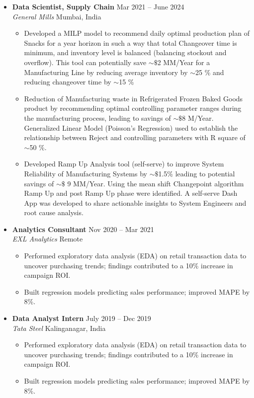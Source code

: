 \documentclass[a4paper,10pt]{article}
\newcommand{\resumeItem}[1]{\item\small{#1}}
\newcommand{\resumeSubheading}[4]{
  \vspace{1pt}\item
    \textbf{#1} \hfill {#2} \\
    \emph{#3} \hfill {#4} \\
}
\begin{document}
\begin{itemize}
    \resumeSubheading
      {Data Scientist, Supply Chain}{Mar 2021 -- June 2024}
      {General Mills}{Mumbai, India}
      \begin{itemize}
          \resumeItem{
            Developed a MILP model to recommend daily optimal production plan of Snacks for a year horizon in such a
            way that total Changeover time is minimum, and inventory level is balanced (balancing stockout and overflow).
            This tool can potentially save $\sim\$$2 MM/Year for a Manufacturing Line by reducing average inventory by $\sim$25 \%
            and reducing changeover time by $\sim$15 \%
          }
          \resumeItem{
            Reduction of Manufacturing waste in Refrigerated Frozen Baked Goods product by recommending optimal
            controlling parameter ranges during the manufacturing process, leading to savings of $\sim\$$8 M/Year. Generalized
            Linear Model (Poisson’s Regression) used to establish the relationship between Reject and controlling
            parameters with R square of $\sim$50 \%.
          }
          \resumeItem{
            Developed Ramp Up Analysis tool (self-serve) to improve System Reliability of Manufacturing Systems by
            $\sim\$$1.5\% leading to potential savings of $\sim\$$ 9 MM/Year. Using the mean shift Changepoint algorithm Ramp Up
            and post Ramp Up phase were identified. A self-serve Dash App was developed to share actionable insights
            to System Engineers and root cause analysis.
          }
      \end{itemize}
    
    \resumeSubheading
      {Analytics Consultant}{Nov 2020 -- Mar 2021}
      {EXL Analytics}{Remote}
      \begin{itemize}
          \resumeItem{Performed exploratory data analysis (EDA) on retail transaction data to uncover purchasing trends; findings contributed to a 10\% increase in campaign ROI.}
          \resumeItem{Built regression models predicting sales performance; improved MAPE by 8\%.}
      \end{itemize}

    \resumeSubheading
      {Data Analyst Intern}{July 2019 -- Dec 2019}
      {Tata Steel}{Kalinganagar, India}
      \begin{itemize}
          \resumeItem{Performed exploratory data analysis (EDA) on retail transaction data to uncover purchasing trends; findings contributed to a 10\% increase in campaign ROI.}
          \resumeItem{Built regression models predicting sales performance; improved MAPE by 8\%.}
      \end{itemize}
\end{itemize}
\end{document}

